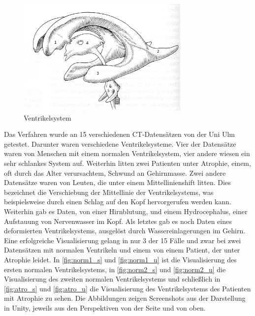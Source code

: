 \begin{figure}[!h] 
\centering 
\includegraphics[width=0.75\textwidth]{Logos/Ventrikelsystem_V.png}
\caption{Ventrikelsystem} 
\label{fig:ventrik} 
\end{figure}



Das Verfahren wurde an 15 verschiedenen CT-Datensätzen von der Uni Ulm getestet. Darunter waren verschiedene Ventrikelsysteme. Vier der Datensätze waren von Menschen mit einem normalen Ventrikelsystem, vier andere wiesen ein sehr schlankes System auf. Weiterhin litten zwei Patienten unter Atrophie, einem, oft durch das Alter verursachtem, Schwund an Gehirnmasse. Zwei andere Datensätze waren von Leuten, die unter einem Mittellinienshift litten. Dies bezeichnet die Verschiebung der Mittellinie der Ventrikelsystems, was beispielsweise durch einen Schlag auf den Kopf hervorgerufen werden kann. Weiterhin gab es Daten, von einer Hirnblutung, und einem Hydrocephalus, einer Aufstauung von Nervenwasser im Kopf. Als letztes gab es noch Daten eines deformierten Ventrikelsystems, ausgelöst durch Wassereinlagerungen im Gehirn.
\newline
Eine erfolgreiche Visualisierung gelang in nur 3 der 15 Fälle und zwar bei zwei Datensätzen mit normalen Ventrikeln und einem von einem Patient, der unter Atrophie leidet. In \autoref{fig:norm1_s} und \autoref{fig:norm1_u} ist die Visualisierung des ersten normalen Ventrikelsystems, in \autoref{fig:norm2_s} und \autoref{fig:norm2_u} die Visualisierung des zweiten normalen Ventrikelsystems und schließlich in \autoref{fig:atro_s} und \autoref{fig:atro_u} die Visualisierung des Ventrikelsystems des Patienten mit Atrophie zu sehen. Die Abbildungen zeigen Screenshots aus der Darstellung in Unity, jeweils aus den Perspektiven von der Seite und von oben.

